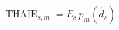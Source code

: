\documentclass[border=8pt]{standalone}
\begin{document}
\color{ink}
$\displaystyle \operatorname{THAIE}_{s,m}=E_s\,p_m\!\left(\widehat d_s\right)$
\end{document}
